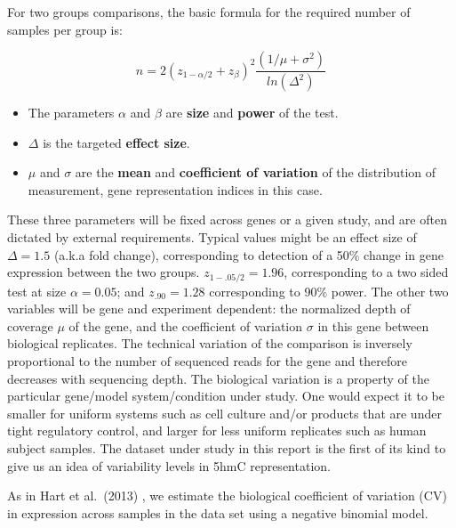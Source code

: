 \documentclass[
]{book}
\providecommand{\tightlist}{%
  \setlength{\itemsep}{0pt}\setlength{\parskip}{0pt}}
\begin{document}
For two groups comparisons, the basic formula for the required number of samples per group is:

\[ n = 2(z_{1-\alpha/2} + z_{\beta})^2 \frac{(1/\mu + \sigma^2)}{ln(\Delta^2)} \]

\begin{itemize}
\tightlist
\item
  The parameters \(\alpha\) and \(\beta\) are \textbf{size} and \textbf{power} of the test.\\
\item
  \(\Delta\) is the targeted \textbf{effect size}.\\
\item
  \(\mu\) and \(\sigma\) are the \textbf{mean} and \textbf{coefficient of variation}
  of the distribution of measurement, gene representation indices in this case.
\end{itemize}

These three parameters will be fixed across genes or a given study, and are often dictated by
external requirements. Typical values might be an effect size of \(\Delta = 1.5\)
(a.k.a fold change), corresponding to detection of a 50\% change in gene expression
between the two groups.
\(z_{1 - .05/2} = 1.96\), corresponding to a two sided test at size \(\alpha = 0.05\);
and \(z_{.90}= 1.28\) corresponding to 90\% power.
The other two variables will be gene and experiment dependent: the normalized depth
of coverage \(\mu\) of the gene, and the coefficient of variation \(\sigma\) in this
gene between biological replicates. The technical variation of the
comparison is inversely proportional to the number of sequenced reads
for the gene and therefore decreases with sequencing depth.
The biological variation is a property of the particular gene/model system/condition under study.
One would expect it to be smaller for uniform systems such as cell culture and/or products that
are under tight regulatory control, and larger for less uniform replicates such
as human subject samples. The dataset under study in this report is the first of its
kind to give us an idea of variability levels in 5hmC representation.

As in Hart et al.~(2013) \citep{Hart:2013aa}
, we estimate the
biological coefficient of variation (CV) in expression across samples in the data set
using a negative binomial model.
\end{document}

